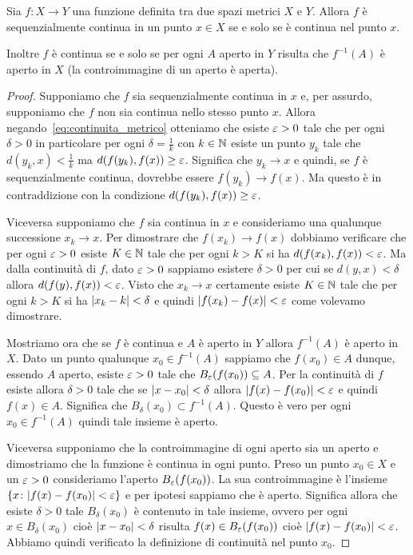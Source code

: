 \begin{theorem}
Sia $f\colon X \to Y$ una funzione definita tra due spazi metrici $X$ e $Y$.
Allora $f$ è sequenzialmente continua in un punto $x\in X$ se e solo se è
continua nel punto $x$.

Inoltre $f$ è continua se e solo se
per ogni $A$ aperto in $Y$ risulta che $f^{-1}(A)$ è aperto in $X$
(la controimmagine di un aperto è aperta).
\end{theorem}
%
\begin{proof}
Supponiamo che $f$ sia sequenzialmente continua in $x$
e, per assurdo, supponiamo che $f$ non sia continua nello stesso punto $x$.
Allora negando~\eqref{eq:continuita_metrico} otteniamo che esiste $\varepsilon>0$
tale che per ogni $\delta>0$ in particolare per ogni $\delta = \frac{1}{k}$
con $k\in \mathbb N$ esiste un punto $y_k$ tale che $d(y_k,x)<\frac 1 k$ ma
$d(f(y_k),f(x))\ge \varepsilon$. Significa che $y_k \to x$ e quindi,
se $f$ è sequenzialmente continua, dovrebbe essere $f(y_k)\to f(x)$. Ma
questo è in contraddizione con la condizione $d(f(y_k),f(x))\ge \varepsilon$.

Viceversa supponiamo che $f$ sia continua in $x$ e consideriamo una qualunque
successione $x_k \to x$.
Per dimostrare che $f(x_k)\to f(x)$ dobbiamo verificare che per ogni
$\varepsilon>0$ esiste $K\in \mathbb N$ tale che per ogni $k>K$ si ha $d(f(x_k),f(x)) < \varepsilon$.
Ma dalla continuità di $f$, dato $\varepsilon>0$ sappiamo esistere $\delta>0$ per cui
se $d(y,x)<\delta$ allora $d(f(y),f(x))<\varepsilon$. Visto che $x_k\to x$
certamente esiste $K\in \mathbb N$ tale che per ogni $k>K$ si ha ${\left|x_k-k\right|}<\delta$
e quindi ${\left|f(x_k)-f(x)\right|}< \varepsilon$ come volevamo dimostrare.

Mostriamo ora che se $f$ è continua e $A$ è aperto in $Y$ allora $f^{-1}(A)$
è aperto in $X$.
Dato un punto qualunque $x_0\in f^{-1}(A)$ sappiamo che $f(x_0)\in A$ dunque, essendo
$A$ aperto, esiste $\varepsilon>0$ tale che $B_\varepsilon(f(x_0))\subseteq A$.
Per la continuità di $f$ esiste allora $\delta>0$ tale che se ${\left|x-x_0\right|} < \delta$
allora ${\left|f(x)-f(x_0)\right|}<\varepsilon$ e quindi $f(x)\in A$. Significa che $B_\delta(x_0)\subset f^{-1}(A)$.
Questo è vero per ogni $x_0\in f^{-1}(A)$ quindi tale insieme è aperto.

Viceversa supponiamo che la controimmagine di ogni aperto sia un aperto e
dimostriamo che la funzione è continua in ogni punto.
Preso un punto $x_0\in X$ e un $\varepsilon>0$ consideriamo l'aperto $B_\varepsilon(f(x_0))$.
La sua controimmagine è l'insieme ${\left\{ x\colon {\left|f(x)-f(x_0)\right|} < \varepsilon \right\}}$ e
per ipotesi sappiamo che è aperto. Significa allora che esiste $\delta>0$
tale $B_\delta(x_0)$ è contenuto in tale insieme, ovvero per ogni $x\in B_\delta(x_0)$
cioè ${\left|x-x_0\right|}<\delta$
risulta $f(x) \in B_\varepsilon(f(x_0))$
cioè ${\left|f(x)-f(x_0)\right|}<\varepsilon$.
Abbiamo quindi verificato la definizione di
continuità nel punto $x_0$.
\end{proof}


